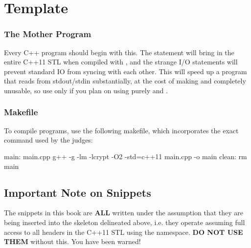 \documentclass[../main]{subfiles}
\begin{document}
\section{Template}
    \subsubsection*{The Mother Program}
        Every C++ program should begin with this.
        The  statement will bring in the entire C++11 STL when compiled with , and the strange I/O statements will prevent standard IO from syncing with each other. This will speed up a program that reads from stdout/stdin substantially, at the cost of making  and  completely unusable, so use only if you plan on using purely  and .
        

    \subsubsection*{Makefile}
    To compile programs, use the following makefile, which incorporates the exact command used by the judges:
    \begin{cpp}
    main: main.cpp
        g++ -g -lm -lcrypt -O2 -std=c++11 main.cpp -o main
    clean:
        rm main
    \end{cpp}

\subsection{Important Note on Snippets}
    The snippets in this book are \textbf{ALL} written under the assumption that they are being inserted into the skeleton delineated above, i.e. they operate assuming full access to all headers in the C++11 STL using the  namespace. \textbf{DO NOT USE THEM} without this. You have been warned!
\end{document}
